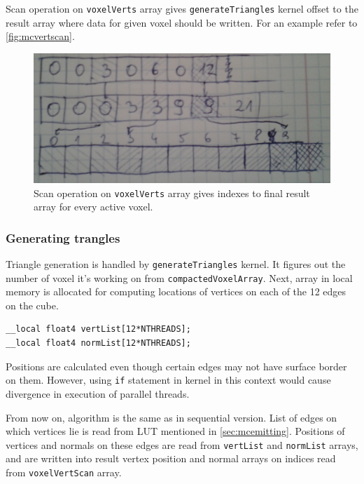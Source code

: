 Scan operation on \texttt{voxelVerts} array gives \texttt{generateTriangles}
kernel offset to the result array where data for given voxel should be written.
For an example refer to \autoref{fig:mcvertscan}.

\begin{figure}
	\begin{center}
		\includegraphics[width=\textwidth]{chapters/marchingcubes/vertscan.jpg}
	\end{center}
	\caption{Scan operation on \texttt{voxelVerts} array gives indexes to
		final result array for every active voxel.
	}
	\label{fig:mcvertscan}
\end{figure}

\subsubsection{Generating trangles}

Triangle generation is handled by \texttt{generateTriangles} kernel. It figures
out the number of voxel it's working on from \texttt{compactedVoxelArray}. Next,
array in local memory is allocated for computing locations of vertices on each
of the 12 edges on the cube.

\begin{lstlisting}
__local float4 vertList[12*NTHREADS];
__local float4 normList[12*NTHREADS];
\end{lstlisting}

Positions are calculated even though certain edges may not have surface border
on them. However, using \texttt{if} statement in kernel in this context would
cause divergence in execution of parallel threads.

From now on, algorithm is the same as in sequential version. List of edges on
which vertices lie is read from LUT mentioned in \autoref{sec:mcemitting}.
Positions of vertices and normals on these edges are read from \texttt{vertList}
and \texttt{normList} arrays, and are written into result vertex position and
normal arrays on indices read from \texttt{voxelVertScan} array.
